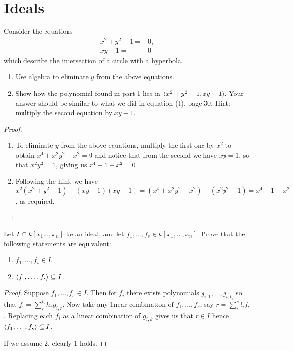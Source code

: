 \section{Ideals}


\begin{exercise}{1}
Consider the equations
\begin{align*}
    x^2+y^2-1 =& 0,\\
    xy-1 =& 0
\end{align*}
which describe the intersection of a circle with a hyperbola.
\begin{enumerate}
    \item Use algebra to eliminate $y$ from the above equations.
    \item Show how the polynomial found in part 1 lies in $\langle x^2+y^2-1, xy-1\rangle$. Your answer should be similar to what we did in equation (1), page 30. Hint: multiply the second equation by $xy-1$.
\end{enumerate}
\end{exercise}
\begin{proof}
\begin{enumerate}
    \item To eliminate $y$ from the above equations, multiply the first one by $x^2$ to obtain $x^4+x^2y^2-x^2=0$ and notice that from the second we have $xy=1$, so that $x^2y^2=1$, giving us $x^4+1-x^2=0$.
    \item Following the hint, we have $x^2(x^2+y^2-1)-(xy-1)(xy+1) =(x^4+x^2y^2-x^2)-(x^2y^2-1) =x^4+1-x^2$, as required.
\end{enumerate}
\end{proof}

\begin{exercise}{2}
Let $I\subseteq k[x_1\dots,x_n]$ be an ideal, and let $f_1,\dots,f_s\in k[x_1,\dots,x_n]$. Prove that the following statements are equivalent:
\begin{enumerate}
    \item $f_1,\dots,f_s\in I$.
    \item $\langle f_1,\dots,f_s\rangle\subseteq I$.
\end{enumerate}
\end{exercise}
\begin{proof}
Suppose $f_1,\dots,f_s\in I$. Then for $f_i$ there exists polynomials $g_{i,1},\dots,g_{i,t_i}$ so that $f_i=\sum_r^{t_i}h_rg_{i,r}$. Now take any linear combination of $f_1,\dots,f_s$, say $r=\sum_i^sl_if_i$. Replacing each $f_i$ as a linear combination of $g_{i,k}$ gives us that $r\in I$ hence $\langle f_1,\dots,f_s\rangle\subseteq I$. 

If we assume 2, clearly 1 holds.
\end{proof}

